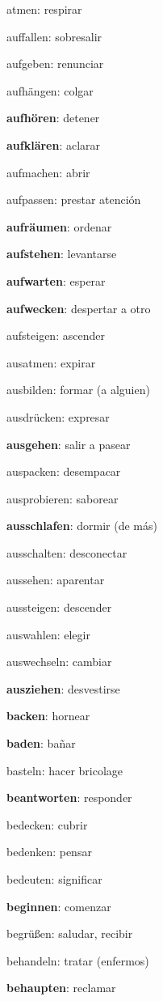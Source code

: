 \begin{multicols}{2}
\begin{myitemize}
\item atmen: respirar
\item auffallen: sobresalir
\item aufgeben: renunciar
\item aufhängen: colgar
\item \textbf{aufhören}: detener
\item \textbf{aufklären}: aclarar
\item aufmachen: abrir
\item aufpassen: prestar atención
\item \textbf{aufräumen}: ordenar
\item \textbf{aufstehen}: levantarse
\item \textbf{aufwarten}: esperar
\item \textbf{aufwecken}: despertar a otro
\item aufsteigen: ascender
\item ausatmen: expirar
\item ausbilden: formar (a alguien)
\item ausdrücken: expresar
\item \textbf{ausgehen}: salir a pasear
\item auspacken: desempacar
\item ausprobieren: saborear
\item \textbf{ausschlafen}: dormir (de más)
\item ausschalten: desconectar
\item aussehen: aparentar
\item aussteigen: descender
\item auswahlen: elegir
\item auswechseln: cambiar
\item \textbf{ausziehen}: desvestirse
\item \textbf{backen}: hornear
\item \textbf{baden}: bañar
\item basteln: hacer bricolage
\item \textbf{beantworten}: responder
\item bedecken: cubrir
\item bedenken: pensar
\item bedeuten: significar
\item \textbf{beginnen}: comenzar
\item begrüßen: saludar, recibir
\item behandeln: tratar (enfermos)
\item \textbf{behaupten}: reclamar

\end{myitemize}
\end{multicols}

